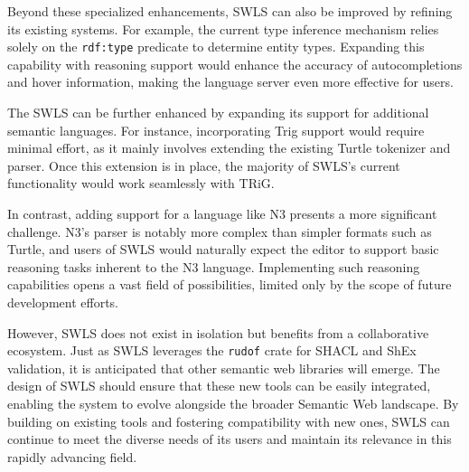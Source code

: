 Beyond these specialized enhancements, SWLS can also be improved by refining its existing systems.
For example, the current type inference mechanism relies solely on the \texttt{rdf:type} predicate to determine entity types.
Expanding this capability with reasoning support would enhance the accuracy of autocompletions and hover information, making the language server even more effective for users.

The SWLS can be further enhanced by expanding its support for additional semantic languages.
For instance, incorporating Trig support would require minimal effort, as it mainly involves extending the existing Turtle tokenizer and parser.
Once this extension is in place, the majority of SWLS’s current functionality would work seamlessly with TRiG.

In contrast, adding support for a language like N3 presents a more significant challenge.
N3’s parser is notably more complex than simpler formats such as Turtle, and users of SWLS would naturally expect the editor to support basic reasoning tasks inherent to the N3 language.
Implementing such reasoning capabilities opens a vast field of possibilities, limited only by the scope of future development efforts.

However, SWLS does not exist in isolation but benefits from a collaborative ecosystem.
Just as SWLS leverages the \texttt{rudof} crate for SHACL and ShEx validation, it is anticipated that other semantic web libraries will emerge.
The design of SWLS should ensure that these new tools can be easily integrated, enabling the system to evolve alongside the broader Semantic Web landscape.
By building on existing tools and fostering compatibility with new ones, SWLS can continue to meet the diverse needs of its users and maintain its relevance in this rapidly advancing field.


